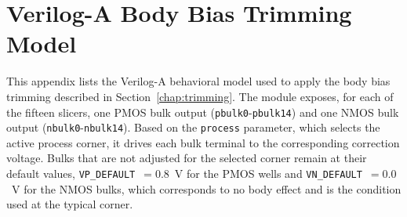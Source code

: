 \chapter{Verilog-A Body Bias Trimming Model}
\label{app:veriloga}

This appendix lists the Verilog-A behavioral model used to apply the body bias trimming described in Section~\ref{chap:trimming}. The module exposes, for each of the fifteen slicers, one PMOS bulk output (\texttt{pbulk0}-\texttt{pbulk14}) and one NMOS bulk output (\texttt{nbulk0}-\texttt{nbulk14}). Based on the \texttt{process} parameter, which selects the active process corner, it drives each bulk terminal to the corresponding correction voltage. Bulks that are not adjusted for the selected corner remain at their default values, \texttt{VP\_DEFAULT}~$=0.8$~V for the PMOS wells and \texttt{VN\_DEFAULT}~$=0.0$~V for the NMOS bulks, which corresponds to no body effect and is the condition used at the typical corner.

